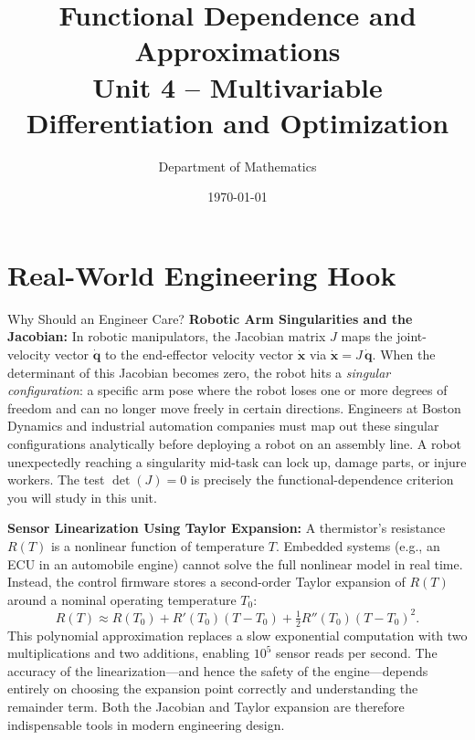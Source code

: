 \documentclass[12pt,a4paper]{article}
\title{\textbf{Functional Dependence and Approximations} \\ \large Unit 4 -- Multivariable Differentiation and Optimization}
\author{Department of Mathematics}
\date{\today}
\begin{document}
\maketitle
\tableofcontents
\newpage

\section{Real-World Engineering Hook}

\begin{curiositybox}{Why Should an Engineer Care?}
\textbf{Robotic Arm Singularities and the Jacobian:}
In robotic manipulators, the Jacobian matrix \( J \) maps the joint-velocity vector \( \dot{\mathbf{q}} \) to the end-effector velocity vector \( \dot{\mathbf{x}} \) via \( \dot{\mathbf{x}} = J\,\dot{\mathbf{q}} \). When the determinant of this Jacobian becomes zero, the robot hits a \emph{singular configuration}: a specific arm pose where the robot loses one or more degrees of freedom and can no longer move freely in certain directions. Engineers at Boston Dynamics and industrial automation companies must map out these singular configurations analytically before deploying a robot on an assembly line. A robot unexpectedly reaching a singularity mid-task can lock up, damage parts, or injure workers. The test \( \det(J) = 0 \) is precisely the functional-dependence criterion you will study in this unit.

\textbf{Sensor Linearization Using Taylor Expansion:}
A thermistor's resistance \( R(T) \) is a nonlinear function of temperature \( T \). Embedded systems (e.g., an ECU in an automobile engine) cannot solve the full nonlinear model in real time. Instead, the control firmware stores a second-order Taylor expansion of \( R(T) \) around a nominal operating temperature \( T_0 \):
\[
  R(T) \approx R(T_0) + R'(T_0)(T - T_0) + \tfrac{1}{2}R''(T_0)(T-T_0)^2.
\]
This polynomial approximation replaces a slow exponential computation with two multiplications and two additions, enabling $10^5$ sensor reads per second. The accuracy of the linearization---and hence the safety of the engine---depends entirely on choosing the expansion point correctly and understanding the remainder term. Both the Jacobian and Taylor expansion are therefore indispensable tools in modern engineering design.
\end{curiositybox}
\end{document}
